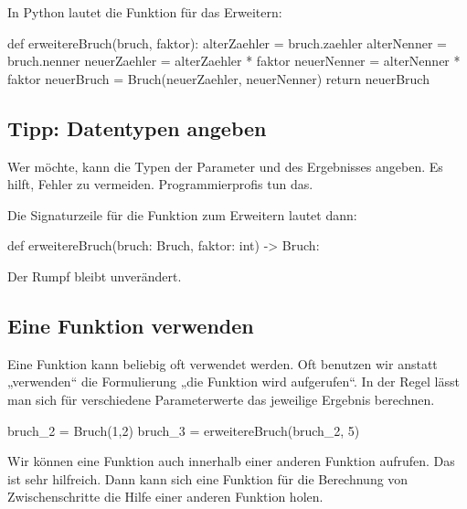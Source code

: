 In Python lautet die Funktion für das Erweitern:
\begin{codePython}
def erweitereBruch(bruch, faktor):
	alterZaehler = bruch.zaehler
	alterNenner = bruch.nenner
	neuerZaehler = alterZaehler * faktor
	neuerNenner = alterNenner * faktor
	neuerBruch = Bruch(neuerZaehler, neuerNenner)
	return neuerBruch
\end{codePython}

\subsection*{Tipp: Datentypen angeben}

Wer möchte, kann die Typen der Parameter und des Ergebnisses angeben. Es hilft, Fehler zu vermeiden. Programmierprofis tun das.

Die Signaturzeile für die Funktion zum Erweitern lautet dann:

\begin{codePython}
def erweitereBruch(bruch: Bruch, faktor: int) -> Bruch:
\end{codePython}

Der Rumpf bleibt unverändert.

\subsection*{Eine Funktion verwenden}

Eine Funktion kann beliebig oft verwendet werden. Oft benutzen wir anstatt „verwenden“ die Formulierung „die Funktion wird aufgerufen“. In der Regel lässt man sich für verschiedene Parameterwerte das jeweilige Ergebnis berechnen.

\begin{codePython}
bruch_2 = Bruch(1,2)
bruch_3 = erweitereBruch(bruch_2, 5)
\end{codePython}

Wir können eine Funktion auch innerhalb einer anderen Funktion aufrufen. Das ist sehr hilfreich. Dann kann sich eine Funktion für die Berechnung von Zwischenschritte die Hilfe einer anderen Funktion holen.

